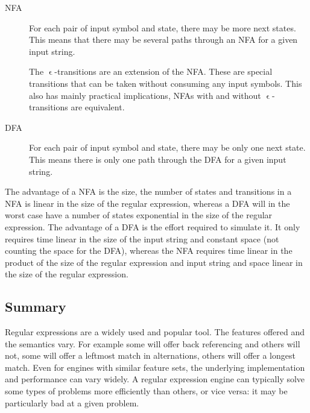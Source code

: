 

\begin{description}
\item[NFA] For each pair of input symbol and state, there may be more
  next states. This means that there may be several paths through an
  NFA for a given input string.

  The $\upvarepsilon$-transitions are an extension of the NFA. These
  are special transitions that can be taken without consuming any
  input symbols. This also has mainly practical implications, NFAs
  with and without $\upvarepsilon$-transitions are equivalent.

\item[DFA] For each pair of input symbol and state, there may be only
  one next state. This means there is only one path through the DFA
  for a given input string.
\end{description}

The advantage of a NFA is the size, the number of states and
transitions in a NFA is linear in the size of the regular expression,
whereas a DFA will in the worst case have a number of states
exponential in the size of the regular expression. The advantage of a
DFA is the effort required to simulate it. It only requires time
linear in the size of the input string and constant space (not
counting the space for the DFA), whereas the NFA requires time linear
in the product of the size of the regular expression and input string
and space linear in the size of the regular expression.





\subsection{Summary}

Regular expressions are a widely used and popular tool. The features
offered and the semantics vary. For example some will offer back
referencing and others will not, some will offer a leftmost match in
alternations, others will offer a longest match. Even for engines with
similar feature sets, the underlying implementation and performance
can vary widely. A regular expression engine can typically solve some
types of problems more efficiently than others, or vice versa: it may
be particularly bad at a given problem. %

